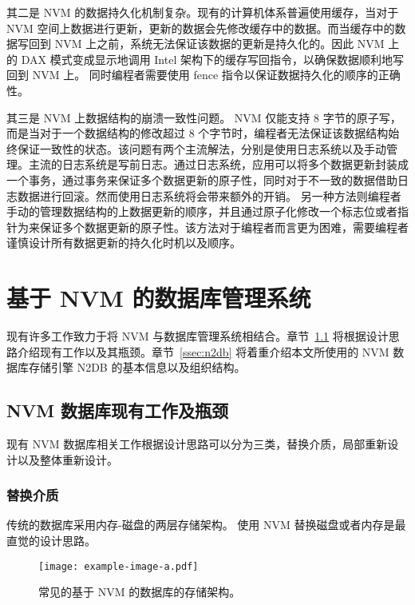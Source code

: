 其二是 NVM 的数据持久化机制复杂。现有的计算机体系普遍使用缓存，当对于 NVM 空间上数据进行更新，更新的数据会先修改缓存中的数据。而当缓存中的数据写回到 NVM 上之前，系统无法保证该数据的更新是持久化的。因此 NVM 上的 DAX 模式变成显示地调用 Intel 架构下的缓存写回指令，以确保数据顺利地写回到 NVM 上。
同时编程者需要使用 fence 指令以保证数据持久化的顺序的正确性。

其三是 NVM 上数据结构的崩溃一致性问题。
NVM 仅能支持 8 字节的原子写，而是当对于一个数据结构的修改超过 8 个字节时，编程者无法保证该数据结构始终保证一致性的状态。该问题有两个主流解法，分别是使用日志系统以及手动管理。主流的日志系统是写前日志。通过日志系统，应用可以将多个数据更新封装成一个事务，通过事务来保证多个数据更新的原子性，同时对于不一致的数据借助日志数据进行回滚。然而使用日志系统将会带来额外的开销。
另一种方法则编程者手动的管理数据结构的上数据更新的顺序，并且通过原子化修改一个标志位或者指针为来保证多个数据更新的原子性。该方法对于编程者而言更为困难，需要编程者谨慎设计所有数据更新的持久化时机以及顺序。


\section{基于 NVM 的数据库管理系统}

现有许多工作致力于将 NVM 与数据库管理系统相结合。章节~\ref{ssec:nvmdb} 将根据设计思路介绍现有工作以及其瓶颈。章节~\ref{ssec:n2db} 将着重介绍本文所使用的 NVM 数据库存储引擎 N2DB 的基本信息以及组织结构。

\subsection{NVM 数据库现有工作及瓶颈}
\label{ssec:nvmdb}

现有 NVM 数据库相关工作根据设计思路可以分为三类，替换介质，局部重新设计以及整体重新设计。

\subsubsection{替换介质}

传统的数据库采用内存-磁盘的两层存储架构。
使用 NVM 替换磁盘或者内存是最直觉的设计思路。

\begin{figure}
    \centering
    \texttt{[image: example-image-a.pdf]}
    \caption{常见的基于 NVM 的数据库的存储架构。}
    \label{fig:nvm-structure}
\end{figure}

